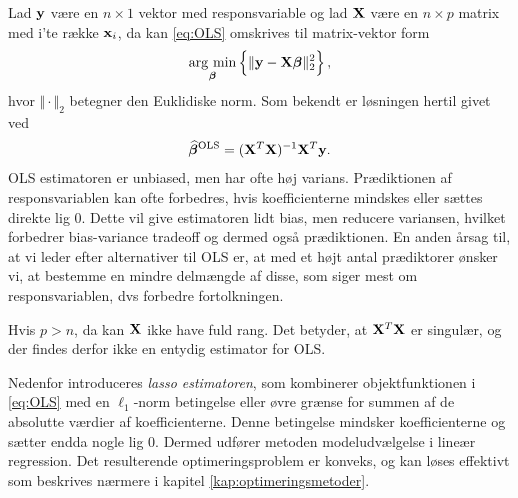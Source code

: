 Lad \(\mathbf{y}\) være en \(n \times 1\) vektor med responsvariable og lad \(\mathbf{X}\) være en $n \times p$ matrix med  i'te række $\mathbf{x}_i$, da kan \eqref{eq:OLS} omskrives til matrix-vektor form
\begin{align*}
\argmin_{ \tbeta} \cbr{ \Vert \y - \X \tbeta \Vert_2^2},
\end{align*}
hvor \(\Vert \cdot \Vert_2\) betegner den Euklidiske norm.
Som bekendt er løsningen hertil givet ved
\begin{align*}
\widehat{\boldsymbol{\beta}}^{\text{OLS}} = (\mathbf{X}^T \mathbf{X})^{-1} \mathbf{X}^T \mathbf{y}.
\end{align*}
OLS estimatoren er unbiased, men har ofte høj varians. 
Prædiktionen af responsvariablen kan ofte forbedres, hvis koefficienterne mindskes eller sættes direkte lig 0.
Dette vil give estimatoren lidt bias, men reducere variansen, hvilket forbedrer bias-variance tradeoff og dermed også prædiktionen.
En anden årsag til, at vi leder efter alternativer til OLS er, at med et højt antal prædiktorer ønsker vi, at bestemme en mindre delmængde af disse, som siger mest om responsvariablen, dvs forbedre fortolkningen.

Hvis \(p > n\), da kan \(\mathbf{X}\) ikke have fuld rang.
Det betyder, at $\mathbf{X}^T \mathbf{X}$ er singulær, og der findes derfor ikke en entydig estimator for OLS.

Nedenfor introduceres \textit{lasso estimatoren}, som kombinerer objektfunktionen i \eqref{eq:OLS} med en $\ell_1$-norm betingelse eller øvre grænse for summen af de absolutte værdier af koefficienterne.
Denne betingelse mindsker koefficienterne og sætter endda nogle lig 0. 
Dermed udfører metoden modeludvælgelse i lineær regression.
Det resulterende optimeringsproblem er konveks, og kan løses effektivt som beskrives nærmere i kapitel \ref{kap:optimeringsmetoder}.
%




%